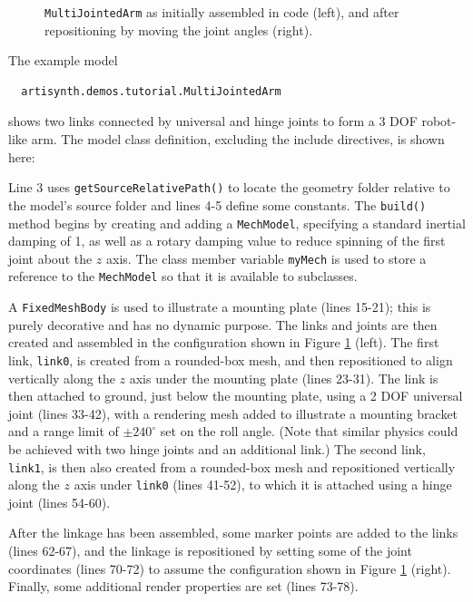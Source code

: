 \begin{figure}[ht]
\begin{center}
\begin{tabular}{cc}
\end{tabular}
\end{center}
\caption{{\tt MultiJointedArm} as initially assembled in code (left),
and after repositioning by moving the joint angles (right).}
\label{MultiJointedArm:fig}
\end{figure}

The example model
%
\begin{verbatim}
  artisynth.demos.tutorial.MultiJointedArm
\end{verbatim}
%
shows two links connected by universal and hinge joints to form a 3 DOF
robot-like arm. The model class definition, excluding the include directives,
is shown here:
%
\lstset{numbers=left}
\iflatexml

\else

\fi
\lstset{numbers=none}
%
Line 3 uses {\tt getSourceRelativePath()} to locate the geometry folder
relative to the model's source folder and lines 4-5 define some constants.  The
{\tt build()} method begins by creating and adding a {\tt MechModel},
specifying a standard inertial damping of 1, as well as a rotary damping value
to reduce spinning of the first joint about the $z$ axis. The class member
variable {\tt myMech} is used to store a reference to the {\tt MechModel} so
that it is available to subclasses.

A {\tt FixedMeshBody} is used to illustrate a mounting plate (lines 15-21);
this is purely decorative and has no dynamic purpose. The links and joints are
then created and assembled in the configuration shown in
Figure \ref{MultiJointedArm:fig} (left). The first link, {\tt link0}, is
created from a rounded-box mesh, and then repositioned to align vertically
along the $z$ axis under the mounting plate (lines 23-31).  The link is then
attached to ground, just below the mounting plate, using a 2 DOF universal
joint (lines 33-42), with a rendering mesh added to illustrate a mounting
bracket and a range limit of $\pm 240^\circ$ set on the roll angle. (Note that
similar physics could be achieved with two hinge joints and an additional
link.) The second link, {\tt link1}, is then also created from a rounded-box
mesh and repositioned vertically along the $z$ axis under {\tt link0} (lines
41-52), to which it is attached using a hinge joint (lines 54-60).

After the linkage has been assembled, some marker points are added to the
links (lines 62-67), and the linkage is repositioned by setting some of the
joint coordinates (lines 70-72) to assume the configuration shown in
Figure \ref{MultiJointedArm:fig} (right). Finally, some
additional render properties are set (lines 73-78).

